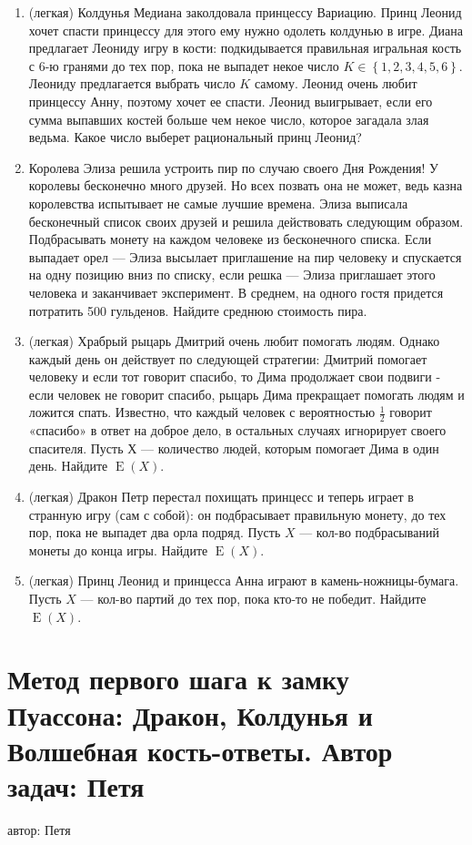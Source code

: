 \documentclass[a4paper,12pt]{article}
\DeclareMathOperator{\E}{E}
\begin{document}
\begin{enumerate} %
\item (легкая) Колдунья Медиана заколдовала принцессу Вариацию. Принц Леонид хочет спасти принцессу для этого ему нужно одолеть колдунью в игре. Диана предлагает Леониду игру в кости: подкидывается правильная игральная кость с 6-ю гранями до тех пор, пока не выпадет некое число $K \in \left\{1,2,3,4,5,6 \right\}$. Леониду предлагается выбрать число $K$ самому. Леонид очень любит принцессу Анну, поэтому хочет ее спасти. Леонид выигрывает, если его сумма выпавших костей больше чем некое число, которое загадала злая ведьма. Какое число выберет рациональный принц Леонид?
\item
Королева Элиза решила устроить пир по случаю своего Дня Рождения!
У королевы бесконечно много друзей. Но всех позвать она не может,
ведь казна королевства испытывает не самые лучшие времена.
Элиза выписала бесконечный список своих друзей и решила действовать следующим образом.
Подбрасывать монету на каждом человеке из бесконечного списка.
Если выпадает орел — Элиза высылает приглашение на пир человеку и спускается на одну позицию вниз по списку,
если решка — Элиза приглашает этого человека и заканчивает эксперимент.
В среднем, на одного гостя придется потратить 500 гульденов.  Найдите среднюю стоимость пира.
\item (легкая)
Храбрый рыцарь Дмитрий очень любит помогать людям. Однако каждый день он действует по следующей стратегии: Дмитрий помогает человеку и если тот говорит спасибо, то Дима продолжает свои подвиги - если человек не говорит спасибо, рыцарь Дима прекращает помогать людям и ложится спать. Известно, что каждый человек с вероятностью $\frac{1}{2}$ говорит «спасибо» в ответ на доброе дело, в остальных случаях игнорирует своего спасителя. Пусть $Х$ — количество людей, которым помогает Дима в один день. Найдите $\E(X)$.
\item (легкая) Дракон Петр перестал похищать принцесс и теперь играет в странную игру (сам с собой): он подбрасывает правильную монету, до тех пор, пока не выпадет два орла подряд. Пусть $X$ — кол-во подбрасываний монеты до конца игры. Найдите $\E(X)$.
\item (легкая) Принц Леонид и принцесса Анна играют в камень-ножницы-бумага.
Пусть $X$ — кол-во партий до тех пор, пока кто-то не победит. Найдите $\E(X)$.
\end{enumerate}

\newpage
\section{Метод первого шага к замку Пуассона: Дракон, Колдунья и Волшебная кость-ответы. Автор задач: Петя}
автор: Петя
\end{document}
